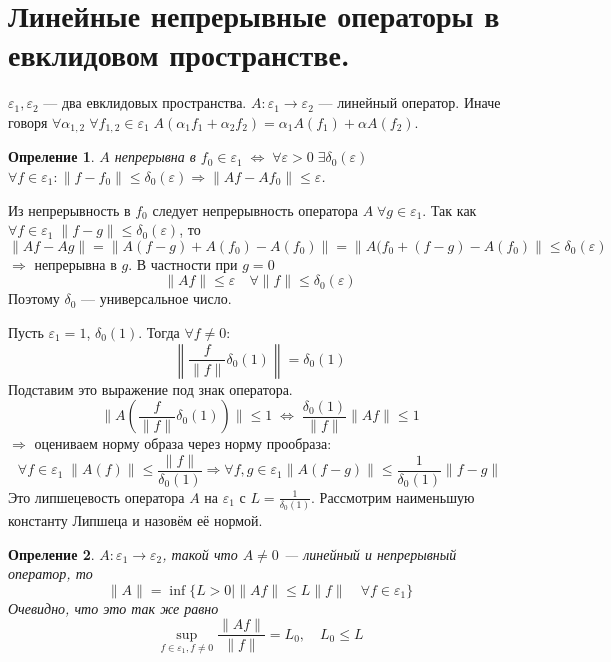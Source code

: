 \documentclass[12pt]{article}
\begin{document}
\section*{Линейные непрерывные операторы в евклидовом пространстве.}
\newtheorem{Theor}{Теорема}
\newtheorem{Opr}{Опреление}
\newtheorem{Prim}{Пример}
\newtheorem{Upr}{Упражнение}
\newtheorem{Nabl}{Наблюдение}
\newtheorem{Zam}{Замечание}

$\varepsilon_1, \varepsilon_2$ --- два евклидовых пространства.
$A : \varepsilon_1 \to \varepsilon_2$ --- линейный оператор.
Иначе говоря $\forall \alpha_{1, 2}\; \forall f_{1, 2} \in \varepsilon_1\; A(\alpha_1 f_1 + \alpha_2 f_2) = \alpha_1 A(f_1) + \alpha A(f_2)$.

\begin{Opr}
    $A$ непрерывна в $f_0 \in \varepsilon_1\; \Leftrightarrow\; \forall \varepsilon > 0\; \exists \delta_0(\varepsilon)$
    $\forall f \in \varepsilon_1\colon \|f - f_0\| \le \delta_0(\varepsilon) \Rightarrow  \|Af-Af_0\| \le \varepsilon$.
\end{Opr}

Из непрерывность в $f_0$ следует непрерывность оператора $A\; \forall g \in \varepsilon_1$.
Так как $\forall f \in \varepsilon_1\; \|f - g\| \le \delta_0(\varepsilon)$, то 
$$
\|Af - Ag\| = \|A(f - g) + A(f_0) - A(f_0)\| = \|A(f_0 + (f - g)
- A(f_0)\| \le \delta_0(\varepsilon)
$$
$\Rightarrow$ непрерывна в $g$.
В частности при $g = 0$
$$
\|Af\| \le \varepsilon\quad \forall \|f\| \le \delta_0(\varepsilon)
$$
Поэтому $\delta_0$ --- универсальное число.

Пусть $\varepsilon_1 = 1$, $\delta_0(1)$.
Тогда $\forall f \ne 0$:
$$
\left \| \frac{f}{\|f\|}\delta_0(1)\right \| = \delta_0(1)
$$
Подставим это выражение под знак оператора.
$$
\|A(\frac{f}{\|f\|}\delta_0(1))\| \le 1\; \Leftrightarrow\; \frac{\delta_0(1)}{\|f\|}\|Af\| \le 1
$$
$\Rightarrow$ оцениваем норму образа через норму
прообраза:
$$
\forall f \in \varepsilon_1\; \|A(f)\| \le \frac{\|f\|}{\delta_0(1)} \Rightarrow  \forall f,g \in \varepsilon_1 \|A(f-g)\| \le \frac{1}{\delta_0(1)}\|f - g\|
$$
Это липшецевость оператора $A$ на $\varepsilon_1$ с $L=\frac{1}{\delta_0(1)}$.
Рассмотрим наименьшую константу Липшеца и назовём её нормой.


\begin{Opr}
    $A : \varepsilon_1 \to \varepsilon_2$, такой что $A \ne 0$ --- линейный и непрерывный оператор, то
    $$
    \|A\| = \inf\{L > 0 \mid \|Af\| \le L\|f\| \quad \forall f \in \varepsilon_1\}
    $$
    Очевидно, что это так же равно
    $$
    \sup\limits_{f \in \varepsilon_1, f \ne 0} \frac {\|Af\|}{\|f\|}=L_0,\quad L_0 \le L
    $$
\end{Opr}
\end{document}
